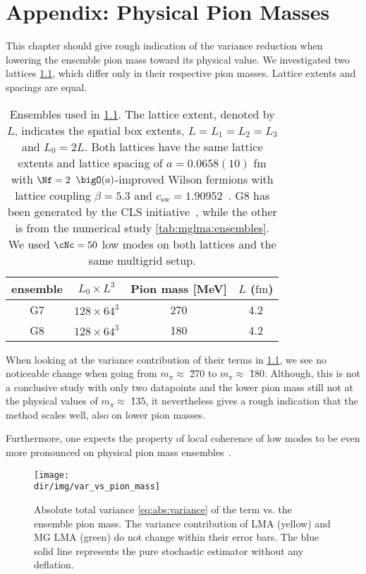 \chapter{Appendix: Physical Pion Masses}
\label{ch:appendix:physical:pions}



This chapter should give rough indication of the variance reduction when lowering the ensemble pion mass toward its physical value.
We investigated two lattices \cref{tab:pion:ensembles}, which differ only in their respective pion masses.
Lattice extents and spacings are equal.

\begin{table}[t]
\centering
\begin{tabular}{cccc}
\toprule
{ensemble}&
{$L_0 \times L^3$} &
{Pion mass [MeV]} &
{$L$ ($\mathrm{fm}$)} \\
\midrule
G7 & $128 \times 64^3$ & 270 & 4.2 \\
G8 & $128 \times 64^3$ & 180 & 4.2 \\
\bottomrule
\end{tabular}
\caption{\label{tab:pion:ensembles}%
Ensembles used in \cref{fig:var:vs:pion:mass}.
The lattice extent, denoted by $L$, indicates the spatial box extents, $L = L_1 = L_2 = L_3$ and $L_0 = 2L$.
Both lattices have the same lattice extents and lattice spacing of $a = 0.0658(10)$ fm with $\Nf=2$ $\bigO(a)$-improved Wilson fermions with lattice coupling $\beta=5.3$ and $c_\mathrm{sw} = 1.90952$~\cite{online:cls,Jansen:1998mx}.
G8 has been generated by the CLS initiative~\cite{online:cls}, while the other is from the numerical study \cref{tab:mglma:ensembles}.
We used $\cNc=50$ low modes on both lattices and the same multigrid setup.
}
\end{table}

When looking at the variance contribution of their  terms in \cref{fig:var:vs:pion:mass}, we see no noticeable change when going from $m_{\pi} \approx $ \u{270}{\MeV} to $m_{\pi} \approx $ \u{180}{\MeV}.
Although, this is not a conclusive study with only two datapoints and the lower pion mass still not at the physical values of $m_{\pi} \approx $ \u{135}{\MeV}, it nevertheless gives a rough indication that the method scales well, also on lower pion masses.

Furthermore, one expects the property of local coherence of low modes to be even more pronounced on physical pion mass ensembles~\cite{Luescher2007}.

\begin{figure}
\centering
\texttt{[image: \\dir/img/var\_vs\_pion\_mass]}
\caption{
Absolute total variance \cref{eq:abs:variance} of the  term vs. the ensemble pion mass.
The  variance contribution of LMA (yellow) and MG LMA (green) do not change within their error bars.
The blue solid line represents the pure stochastic estimator without any deflation.
}
\label{fig:var:vs:pion:mass}
\end{figure}

